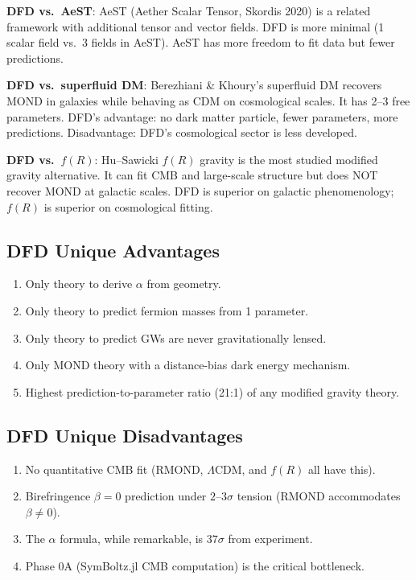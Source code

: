 \documentclass[11pt,a4paper]{article}
\begin{document}
\textbf{DFD vs.\ AeST}: AeST (Aether Scalar Tensor, Skordis 2020) is a related framework with additional tensor and vector fields. DFD is more minimal (1 scalar field vs.\ 3 fields in AeST). AeST has more freedom to fit data but fewer predictions.

\textbf{DFD vs.\ superfluid DM}: Berezhiani \& Khoury's superfluid DM recovers MOND in galaxies while behaving as CDM on cosmological scales. It has 2--3 free parameters. DFD's advantage: no dark matter particle, fewer parameters, more predictions. Disadvantage: DFD's cosmological sector is less developed.

\textbf{DFD vs.\ $f(R)$}: Hu--Sawicki $f(R)$ gravity is the most studied modified gravity alternative. It can fit CMB and large-scale structure but does NOT recover MOND at galactic scales. DFD is superior on galactic phenomenology; $f(R)$ is superior on cosmological fitting.

\subsection{DFD Unique Advantages}

\begin{enumerate}
\item Only theory to derive $\alpha$ from geometry.
\item Only theory to predict fermion masses from 1 parameter.
\item Only theory to predict GWs are never gravitationally lensed.
\item Only MOND theory with a distance-bias dark energy mechanism.
\item Highest prediction-to-parameter ratio (21:1) of any modified gravity theory.
\end{enumerate}

\subsection{DFD Unique Disadvantages}

\begin{enumerate}
\item No quantitative CMB fit (RMOND, $\Lambda$CDM, and $f(R)$ all have this).
\item Birefringence $\beta = 0$ prediction under $2$--$3\sigma$ tension (RMOND accommodates $\beta \neq 0$).
\item The $\alpha$ formula, while remarkable, is $37\sigma$ from experiment.
\item Phase 0A (SymBoltz.jl CMB computation) is the critical bottleneck.
\end{enumerate}
\end{document}
